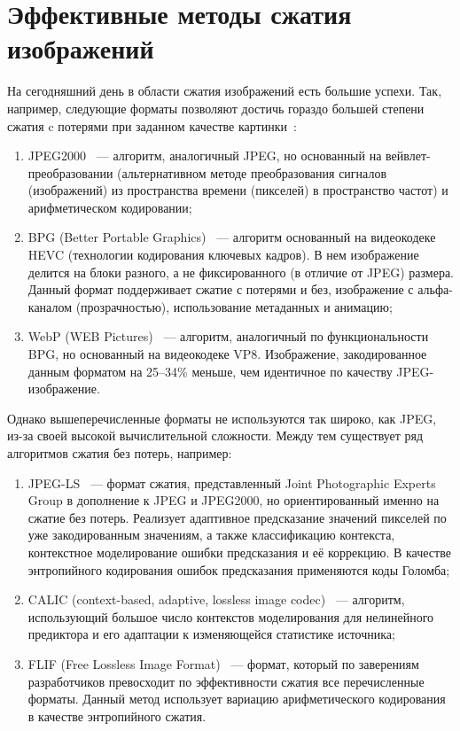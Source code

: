 \documentclass[times,specification,annotation]{itmo-student-thesis}
\begin{document}
\section{Эффективные методы сжатия изображений}\label{sec:effective-compression-methods}

На сегодняшний день в области сжатия изображений есть большие успехи. Так, например, следующие форматы позволяют достичь гораздо большей степени сжатия c потерями при заданном качестве картинки~\cite{mozilla-comparison-of-compression-formats}:
\begin{enumerate}
    \item JPEG2000~\cite{jpeg2000-overview} --- алгоритм, аналогичный JPEG, но основанный на вейвлет-преобразовании (альтернативном методе преобразования сигналов (изображений) из пространства времени (пикселей) в пространство частот) и арифметическом кодировании;
    \item BPG (Better Portable Graphics)~\cite{bpg-website} --- алгоритм основанный на видеокодеке HEVC (технологии кодирования ключевых кадров). В нем изображение делится на блоки разного, а не фиксированного (в отличие от JPEG) размера. Данный формат поддерживает сжатие с потерями и без, изображение с альфа-каналом (прозрачностью), использование метаданных и анимацию;
    \item WebP (WEB Pictures)~\cite{webp-overview} --- алгоритм, аналогичный по функциональности BPG, но основанный на видеокодеке VP8. Изображение, закодированное данным форматом на 25--34\% меньше, чем идентичное по качеству JPEG-изображение.
\end{enumerate}

Однако вышеперечисленные форматы не используются так широко, как JPEG, из-за своей высокой вычислительной сложности. Между тем существует ряд алгоритмов сжатия без потерь, например:

\begin{enumerate}
    \item JPEG-LS~\cite{jpeg-ls-overview} --- формат сжатия, представленный Joint Photographic Experts Group в дополнение к JPEG и JPEG2000, но ориентированный именно на сжатие без потерь. Реализует адаптивное предсказание значений пикселей по уже закодированным значениям, а также  классификацию контекста, контекстное моделирование ошибки предсказания и её коррекцию. В качестве энтропийного кодирования ошибок предсказания применяются коды Голомба;
    \item CALIC (context-based, adaptive, lossless image codec)~\cite{calic-overview} --- алгоритм, использующий большое число контекстов моделирования для нелинейного предиктора и его адаптации к изменяющейся статистике источника;
    \item FLIF (Free Lossless Image Format)~\cite{flif-website} --- формат, который по заверениям разработчиков превосходит по эффективности сжатия все перечисленные форматы. Данный метод использует вариацию арифметического кодирования в качестве энтропийного сжатия.
\end{enumerate}
\end{document}
